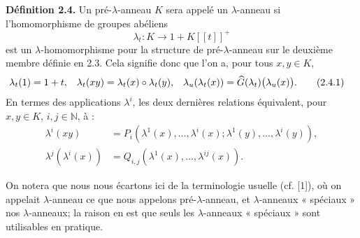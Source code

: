 \documentclass[11pt]{article}
\begin{document}
\textbf{Définition 2.4.} Un pré-\(\lambda\)-anneau \(K\) sera appelé un \(\lambda\)-anneau si l'homomorphisme de groupes abéliens
\[
  \lambda_t:K\longrightarrow1+K[[t]]^+
\]
est un \(\lambda\)-homomorphisme pour la structure de pré-\(\lambda\)-anneau sur le deuxième membre définie en 2.3. Cela signifie donc que l'on a, pour tous \(x,y\in K\),
\begin{align}
  \lambda_t(1)&=1+t,&
  \lambda_t(xy)&=\lambda_t(x)\circ\lambda_t(y),&
  \lambda_u(\lambda_t(x))&=\widehat G(\lambda_t)\bigl(\lambda_u(x)\bigr).
  \tag{2.4.1}
\end{align}
En termes des applications \(\lambda^i\), les deux dernières relations équivalent, pour \(x,y\in K\), \(i,j\in\mathbb N\), à :
\begin{align}
  \lambda^i(xy)
  &=P_i(\lambda^1(x),\ldots,\lambda^i(x);
       \lambda^1(y),\ldots,\lambda^i(y)), \tag{2.4.2}\\
  \lambda^j(\lambda^i(x))
  &=Q_{i,j}(\lambda^1(x),\ldots,\lambda^{ij}(x)). \tag{2.4.3}
\end{align}

On notera que nous nous écartons ici de la terminologie usuelle (cf. [1]), où on appelait \(\lambda\)-anneau ce que nous appelons pré-\(\lambda\)-anneau, et \(\lambda\)-anneaux « spéciaux » nos \(\lambda\)-anneaux; la raison en est que seuls les \(\lambda\)-anneaux « spéciaux » sont utilisables en pratique.
\end{document}
